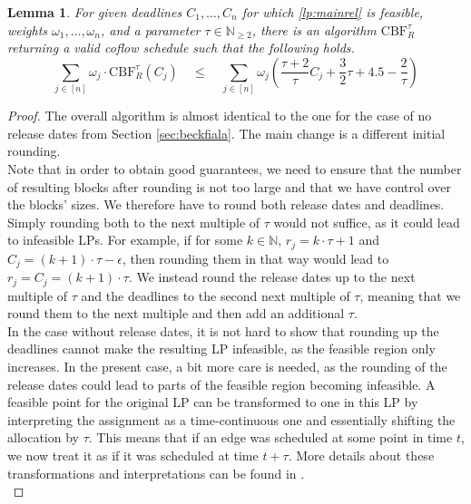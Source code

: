 \documentclass[11pt]{article}
\newtheorem{lemma}[theorem]{Lemma}
\begin{document}
\begin{lemma}\label{lemma:cbfrelapprox}
For given deadlines $C_1,\dotsc,C_n$ for which \ref{lp:mainrel} is feasible, weights $\omega_1,\dotsc,\omega_n$, and a parameter $\tau \in \mathbb{N}_{\ge 2}$, there is an algorithm $\mathrm{CBF}_R^\tau$ returning a valid coflow schedule such that the following holds.
\begin{equation*}
   \sum_{j \in [n]} \omega_j \cdot \mathrm{CBF}_R^\tau(C_j) \quad \le \quad \sum_{j \in [n]}\omega_j \left(\frac{\tau+2}{\tau}C_j + \frac{3}{2}\tau + 4.5 - \frac{2}{\tau}\right)
\end{equation*}
\end{lemma}
\begin{proof}
The overall algorithm is almost identical to the one for the case of no release dates from Section \ref{sec:beckfiala}. The main change is a different initial rounding.\\

Note that in order to obtain good guarantees, we need to ensure that the number of resulting blocks after rounding is not too large and that we have control over the blocks' sizes. We therefore have to round both release dates and deadlines. Simply rounding both to the next multiple of $\tau$ would not suffice, as it could lead to infeasible LPs. For example, if for some $k\in \mathbb{N}$, $r_j = k \cdot \tau + 1$ and $C_j = (k+1)\cdot \tau-\epsilon$, then rounding them in that way would lead to $r_j = C_j = (k+1)\cdot \tau$. We instead round the release dates up to the next multiple of $\tau$ and the deadlines to the second next multiple of $\tau$, meaning that we round them to the next multiple and then add an additional $\tau$.\\

In the case without release dates, it is not hard to show that rounding up the deadlines cannot make the resulting LP infeasible, as the feasible region only increases. In the present case, a bit more care is needed, as the rounding of the release dates could lead to parts of the feasible region becoming infeasible. A feasible point for the original LP can be transformed to one in this LP by interpreting the assignment as a time-continuous one and essentially shifting the allocation by $\tau$. This means that if an edge was scheduled at some point in time $t$, we now treat it as if it was scheduled at time $t+\tau$. More details about these transformations and interpretations can be found in \cite{fukunaga22}.\\


\end{proof}
\end{document}
